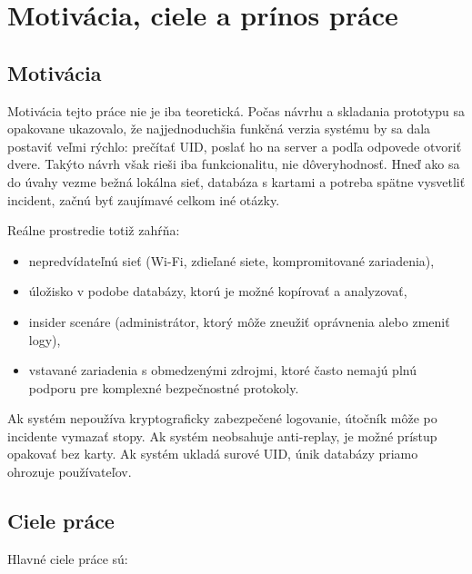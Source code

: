 \documentclass[journal,a4paper,onecolumn]{IEEEtran}
\begin{document}
\section{Motivácia, ciele a prínos práce}

\subsection{Motivácia}

Motivácia tejto práce nie je iba teoretická. Počas návrhu a skladania prototypu sa opakovane ukazovalo, že najjednoduchšia funkčná verzia systému by sa dala postaviť veľmi rýchlo: prečítať UID, poslať ho na server a podľa odpovede otvoriť dvere. Takýto návrh však rieši iba funkcionalitu, nie dôveryhodnosť. Hneď ako sa do úvahy vezme bežná lokálna sieť, databáza s kartami a potreba spätne vysvetliť incident, začnú byť zaujímavé celkom iné otázky.

Reálne prostredie totiž zahŕňa:

\begin{itemize}[leftmargin=*,itemsep=2pt]
  \item nepredvídateľnú sieť (Wi-Fi, zdieľané siete, kompromitované zariadenia),
  \item úložisko v podobe databázy, ktorú je možné kopírovať a analyzovať,
  \item insider scenáre (administrátor, ktorý môže zneužiť oprávnenia alebo zmeniť logy),
  \item vstavané zariadenia s obmedzenými zdrojmi, ktoré často nemajú plnú podporu pre komplexné bezpečnostné protokoly.
\end{itemize}

Ak systém nepoužíva kryptograficky zabezpečené logovanie, útočník môže po incidente vymazať stopy. Ak systém neobsahuje anti-replay, je možné prístup opakovať bez karty. Ak systém ukladá surové UID, únik databázy priamo ohrozuje používateľov.

\subsection{Ciele práce}

Hlavné ciele práce sú:
\end{document}
